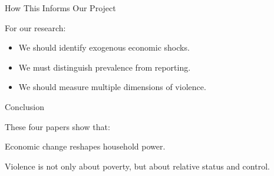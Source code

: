 \documentclass[11pt,aspectratio=169]{beamer}
\begin{document}
\begin{frame}{How This Informs Our Project}

For our research:

\begin{itemize}
    \item We should identify exogenous economic shocks.
    \item We must distinguish prevalence from reporting.
    \item We should measure multiple dimensions of violence.
\end{itemize}

\end{frame}

\begin{frame}{Conclusion}

These four papers show that:

\medskip

\begin{center}
Economic change reshapes household power.
\end{center}

\medskip

Violence is not only about poverty, but about relative status and control.

\end{frame}
\end{document}
